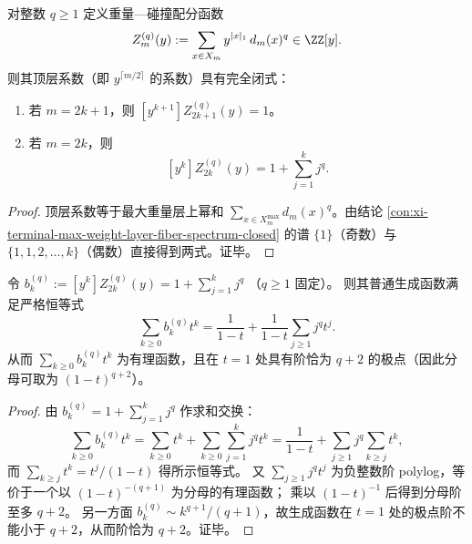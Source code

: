 \begin{conclusion}\label{con:xi-terminal-zq-top-coefficient-faulhaber}
对整数 \(q\ge 1\) 定义重量—碰撞配分函数
\[
Z_m^{(q)}(y):=\sum_{x\in X_m}y^{|x|_1}\,d_m(x)^q\in\ZZ[y].
\]
则其顶层系数（即 \(y^{\lceil m/2\rceil}\) 的系数）具有完全闭式：
\begin{enumerate}
  \item 若 \(m=2k+1\)，则 \([y^{k+1}]Z_{2k+1}^{(q)}(y)=1\)。
  \item 若 \(m=2k\)，则
  \[
  [y^{k}]Z_{2k}^{(q)}(y)=1+\sum_{j=1}^{k}j^{q}.
  \]
\end{enumerate}
\end{conclusion}
\begin{proof}
顶层系数等于最大重量层上幂和 \(\sum_{x\in X_m^{\max}}d_m(x)^q\)。由结论 \ref{con:xi-terminal-max-weight-layer-fiber-spectrum-closed} 的谱 \(\{1\}\)（奇数）与 \(\{1,1,2,\dots,k\}\)（偶数）直接得到两式。证毕。
\end{proof}

\begin{conclusion}\label{con:xi-terminal-max-weight-top-sector-ogf}
令
\(
b_k^{(q)}:=[y^{k}]Z_{2k}^{(q)}(y)=1+\sum_{j=1}^{k}j^{q}
\)
（\(q\ge 1\) 固定）。
则其普通生成函数满足严格恒等式
\[
\sum_{k\ge 0} b_k^{(q)}t^{k}
=\frac{1}{1-t}+\frac{1}{1-t}\sum_{j\ge 1}j^{q}t^{j}.
\]
从而 \(\sum_{k\ge 0} b_k^{(q)}t^{k}\) 为有理函数，且在 \(t=1\) 处具有阶恰为 \(q+2\) 的极点（因此分母可取为 \((1-t)^{q+2}\)）。
\end{conclusion}
\begin{proof}
由 \(b_k^{(q)}=1+\sum_{j=1}^k j^q\) 作求和交换：
\[
\sum_{k\ge 0}b_k^{(q)}t^k=\sum_{k\ge 0}t^k+\sum_{k\ge 0}\sum_{j=1}^{k}j^q t^k
=\frac{1}{1-t}+\sum_{j\ge 1}j^q\sum_{k\ge j}t^k,
\]
而 \(\sum_{k\ge j}t^k=t^j/(1-t)\) 得所示恒等式。
又 \(\sum_{j\ge 1}j^q t^j\) 为负整数阶 polylog，等价于一个以 \((1-t)^{-(q+1)}\) 为分母的有理函数；
乘以 \((1-t)^{-1}\) 后得到分母阶至多 \(q+2\)。
另一方面 \(b_k^{(q)}\sim k^{q+1}/(q+1)\)，故生成函数在 \(t=1\) 处的极点阶不能小于 \(q+2\)，从而阶恰为 \(q+2\)。证毕。
\end{proof}

